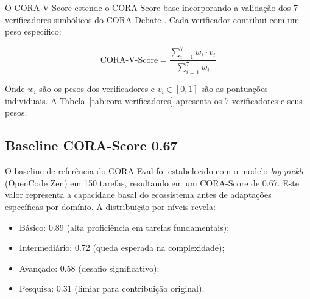 O CORA-V-Score estende o CORA-Score base incorporando a validação
dos 7 verificadores simbólicos do CORA-Debate \cite{opencode2026ecosystem}.
Cada verificador contribui com um peso específico:

\begin{equation}
\text{CORA-V-Score} = \frac{\sum_{i=1}^{7} w_i \cdot v_i}{\sum_{i=1}^{7} w_i}
\label{eq:cora-v-score}
\end{equation}

Onde $w_i$ são os pesos dos verificadores e $v_i \in [0,1]$ são as
pontuações individuais. A Tabela~\ref{tab:cora-verificadores}
apresenta os 7 verificadores e seus pesos.

\begin{table}[htb]
\centering
    \small
\caption{Verificadores CORA e Pesos no CORA-V-Score}
\label{tab:cora-verificadores}
\end{table}

\subsection{Baseline CORA-Score 0.67}

O baseline de referência do CORA-Eval foi estabelecido com o modelo
\textit{big-pickle} (OpenCode Zen) em 150 tarefas, resultando em um
CORA-Score de 0.67. Este valor representa a capacidade basal do
ecossistema antes de adaptações específicas por domínio. A
distribuição por níveis revela:

\begin{itemize}
\item Básico: 0.89 (alta proficiência em tarefas fundamentais);
\item Intermediário: 0.72 (queda esperada na complexidade);
\item Avançado: 0.58 (desafio significativo);
\item Pesquisa: 0.31 (limiar para contribuição original).
\end{itemize}

